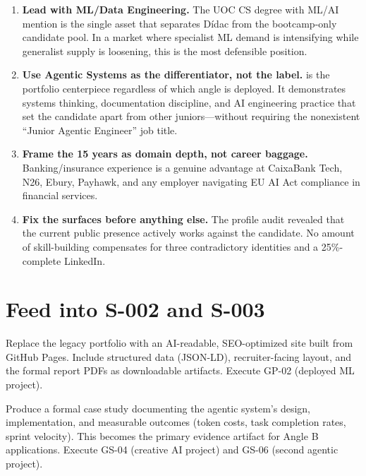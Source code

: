 \documentclass[a4paper,11pt,openany]{report}
\begin{document}
\begin{enumerate}
  \item \textbf{Lead with ML/Data Engineering.} The UOC CS degree with ML/AI
    mention is the single asset that separates Dídac from the bootcamp-only
    candidate pool. In a market where specialist ML demand is intensifying
    while generalist supply is loosening, this is the most defensible position.

  \item \textbf{Use Agentic Systems as the differentiator, not the label.}
    \projectName{} is the portfolio centerpiece regardless of which angle is
    deployed. It demonstrates systems thinking, documentation discipline, and
    AI engineering practice that set the candidate apart from other
    juniors---without requiring the nonexistent ``Junior Agentic Engineer''
    job title.

  \item \textbf{Frame the 15 years as domain depth, not career baggage.}
    Banking/insurance experience is a genuine advantage at CaixaBank Tech,
    N26, Ebury, Payhawk, and any employer navigating EU AI Act compliance in
    financial services.

  \item \textbf{Fix the surfaces before anything else.} The profile audit
    revealed that the current public presence actively works against the
    candidate. No amount of skill-building compensates for three contradictory
    identities and a 25\%-complete LinkedIn.
\end{enumerate}

\section{Feed into S-002 and S-003}

\begin{description}[style=nextline]
  \item[S-002 --- Site Rebuild]
    Replace the legacy portfolio with an AI-readable, SEO-optimized site
    built from \projectName{} GitHub Pages. Include structured data
    (JSON-LD), recruiter-facing layout, and the formal report PDFs as
    downloadable artifacts. Execute GP-02 (deployed ML project).

  \item[S-003 --- Case Study]
    Produce a formal case study documenting the agentic system's design,
    implementation, and measurable outcomes (token costs, task completion
    rates, sprint velocity). This becomes the primary evidence artifact for
    Angle B applications. Execute GS-04 (creative AI project) and GS-06
    (second agentic project).
\end{description}
\end{document}
